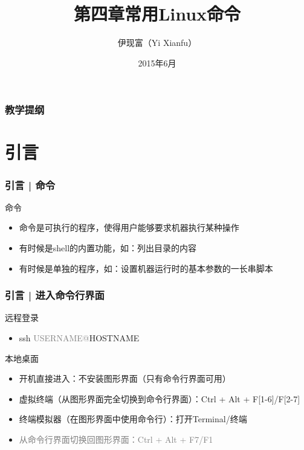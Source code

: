 



\title[常用Linux命令]{第四章\quad 常用Linux命令}
\author[Yixf]{伊现富（Yi Xianfu）}
\date{2015年6月}


\begin{frame}
  \titlepage
\end{frame}

\begin{frame}[plain,label=current]
  \frametitle{教学提纲}
  \setcounter{tocdepth}{3}
  \begin{multicols}{2}
    \tableofcontents
  \end{multicols}
\end{frame}


\section{引言}
\begin{frame}
  \frametitle{引言 | 命令}
  \begin{block}{命令}
    \begin{itemize}
      \item 命令是可执行的程序，使得用户能够要求机器执行某种操作
      \item 有时候是shell的内置功能，如：列出目录的内容
      \item 有时候是单独的程序，如：设置机器运行时的基本参数的一长串脚本
    \end{itemize}
  \end{block}
\end{frame}

\begin{frame}
  \frametitle{引言 | \alert{进入命令行界面}}
  \begin{block}{远程登录}
    \begin{itemize}
      \item ssh \textcolor{gray}{USERNAME@}HOSTNAME
    \end{itemize}
  \end{block}
  \pause
  \begin{block}{本地桌面}
    \begin{itemize}
      \item 开机直接进入：不安装图形界面（只有命令行界面可用）
      \item 虚拟终端（从图形界面完全切换到命令行界面）：Ctrl + Alt + F[1-6]/F[2-7]
      \item 终端模拟器（在图形界面中使用命令行）：打开Terminal/终端
      \item \textcolor{gray}{从命令行界面切换回图形界面：Ctrl + Alt + F7/F1}
    \end{itemize}
  \end{block}
\end{frame}


